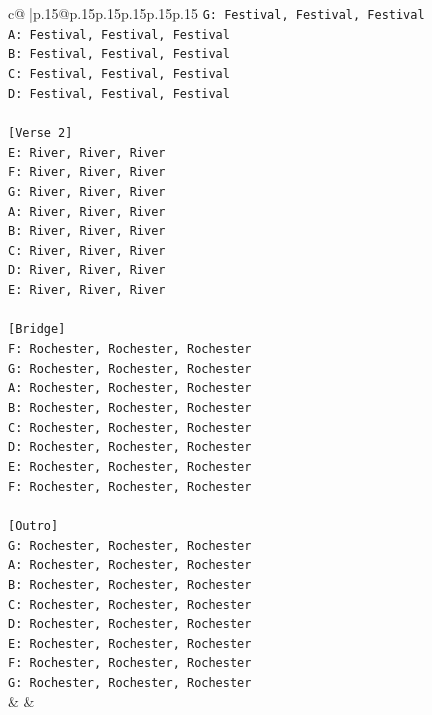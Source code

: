 \documentclass{article}
\begin{document}
{\begin{supertabular}{c@{$\;$}|p{.15\linewidth}@{}p{.15\linewidth}p{.15\linewidth}p{.15\linewidth}p{.15\linewidth}p{.15\linewidth}}
{{{\texttt{G: Festival, Festival, Festival} \\
\texttt{A: Festival, Festival, Festival} \\
\texttt{B: Festival, Festival, Festival} \\
\texttt{C: Festival, Festival, Festival} \\
\texttt{D: Festival, Festival, Festival} \\
\\ 
\texttt{{[}Verse 2{]}} \\
\texttt{E: River, River, River} \\
\texttt{F: River, River, River} \\
\texttt{G: River, River, River} \\
\texttt{A: River, River, River} \\
\texttt{B: River, River, River} \\
\texttt{C: River, River, River} \\
\texttt{D: River, River, River} \\
\texttt{E: River, River, River} \\
\\ 
\texttt{{[}Bridge{]}} \\
\texttt{F: Rochester, Rochester, Rochester} \\
\texttt{G: Rochester, Rochester, Rochester} \\
\texttt{A: Rochester, Rochester, Rochester} \\
\texttt{B: Rochester, Rochester, Rochester} \\
\texttt{C: Rochester, Rochester, Rochester} \\
\texttt{D: Rochester, Rochester, Rochester} \\
\texttt{E: Rochester, Rochester, Rochester} \\
\texttt{F: Rochester, Rochester, Rochester} \\
\\ 
\texttt{{[}Outro{]}} \\
\texttt{G: Rochester, Rochester, Rochester} \\
\texttt{A: Rochester, Rochester, Rochester} \\
\texttt{B: Rochester, Rochester, Rochester} \\
\texttt{C: Rochester, Rochester, Rochester} \\
\texttt{D: Rochester, Rochester, Rochester} \\
\texttt{E: Rochester, Rochester, Rochester} \\
\texttt{F: Rochester, Rochester, Rochester} \\
\texttt{G: Rochester, Rochester, Rochester} \\
            }
        }
    }
    & & \\ \\


\end{supertabular}}
\end{document}
